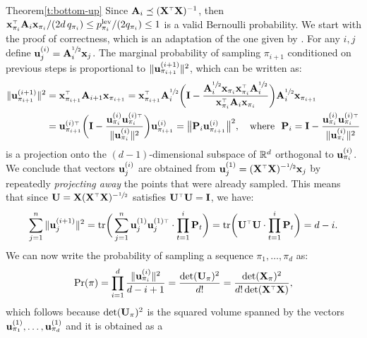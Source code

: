 \documentclass[12pt]{sty/colt2019/colt2018-arxiv}
\begin{document}
\begin{proofof}{Theorem}{\ref{t:bottom-up}}
Since $\A_i\preceq (\X^\top\X)^{-1}$, then $\x_{\pi_i}^\top\A_i\x_{\pi_i}/(2d\, q_{\pi_i})
\leq p_{\pi_i}^{\mathrm{lev}}/(2q_{\pi_i})\leq 1$ is a valid
  Bernoulli probability. We start with the proof of correctness, which
  is an adaptation of the one given by \cite{dpp-independence}.
For any $i,j$ define
$\mathbf u_j^{(i)}=\mathbf A_{i}^{\sfrac12}\mathbf x_{j}$. The
marginal probability of sampling $\pi_{i+1}$ conditioned on previous steps
is proportional to $\|\mathbf u_{\pi_{i+1}}^{(i+1)}\|^2$, which can be written as:
\begin{align*}
  \|\u_{\pi_{i+1}}^{(i+1)}\|^2&=  \x_{\pi_{i+1}}^\top\A_{i+1}\x_{\pi_{i+1}}
  =
  \x_{\pi_{i+1}}^\top\A_{i}^{\sfrac12}\bigg(\I -
    \frac{\A_{i}^{\sfrac12}\x_{\pi_i}\x_{\pi_i}^\top\A_{i}^{\sfrac12}}
    {\x_{\pi_i}^\top\A_{i}\x_{\pi_i}}\bigg)\A_{i}^{\sfrac12}\x_{\pi_{i+1}}\\
  &=\u_{\pi_{i+1}}^{(i)\top}\bigg(\I-\frac{\u_{\pi_i}^{(i)}\u_{\pi_i}^{(i)\top}}
    {\|\u_{\pi_i}^{(i)}\|^2}\bigg)\u_{\pi_{i+1}}^{(i)}
    =\big\|\P_i\u_{\pi_{i+1}}^{(i)}\big\|^2,
    \quad\text{where }\ \P_i=\I-\frac{\u_{\pi_i}^{(i)}\u_{\pi_i}^{(i)\top}}
    {\|\u_{\pi_i}^{(i)}\|^2}
\end{align*}
is a projection onto the $(d-1)$-dimensional
subspace of $\mathbb R^d$ orthogonal to $\mathbf u_{\pi_i}^{(i)}$. We conclude that
vectors $\mathbf u_{j}^{(i)}$ are obtained from $\u_{j}^{(1)}=(\X^\top\X)^{-\sfrac12}\x_j$ by
repeatedly \textit{projecting away} the points that were already
sampled. This means that since $\U=\X (\X^\top\X)^{-\sfrac12}$
satisfies $\U^\top\U=\I$, we have: 
\begin{align*}
  \sum_{j=1}^n\|\u_{j}^{(i+1)}\|^2
  =\tr\bigg(\sum_{j=1}^n\u_j^{(1)}\u_j^{(1)\top}\cdot\prod_{t=1}^{i}\P_t\bigg)
  = \tr\bigg(\U^\top\U\cdot\prod_{t=1}^{i}\P_t\bigg)= d-i.
\end{align*}
We can now write the probability of sampling a sequence
$\pi_1,\dots,\pi_d$ as:
\begin{align*}
  \Pr(\pi) = \prod_{i=1}^d\frac{\|\u_{\pi_i}^{(i)}\|^2}{d-i+1} =
  \frac{\det(\U_\pi)^2}{d!} = \frac{\det(\X_\pi)^2}{d!\det(\X^\top\X)},
\end{align*}
which follows because $\det(\mathbf U_\pi)^2$ is the squared volume spanned
by the vectors $\mathbf u^{(1)}_{\pi_1},\dots,\mathbf u^{(1)}_{\pi_d}$ and it is obtained as a

\end{proofof}
\end{document}
